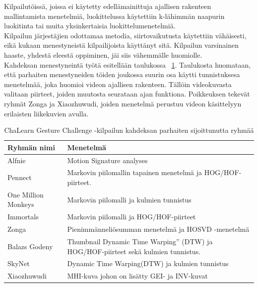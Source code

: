 Kilpailutöissä, joissa ei käytetty edellämainittuja ajallisen rakenteen mallintamista menetelmiä, 
luokittelussa käytettiin k-lähimmän naapurin luokitinta tai muita yksinkertaisia luokittelumenetelmiä. \\

Kilpailun järjestäjien odottamaa metodia, siirtovaikutusta käytettiin vähäisesti, eikä kukaan menestyneistä kilpailijoista käyttänyt sitä.
Kilpailun varsinainen haaste, yhdestä eleestä oppiminen, jäi siis vähemmälle huomiolle. \citep {6239178} \\

Kahdeksan menestyneintä työtä esitellään taulukossa ~\ref{table:dvbt_param}. Taulukosta huomataan, että parhaiten menestyneiden töiden
joukossa suurin osa käytti tunnistuksesa menetelmää, joka huomioi videon ajallisen rakenteen. Tällöin videokuvasta valitaan piirteet, joiden
muutosta seurataan ajan funktiona. Poikkeuksen tekevät ryhmät Zonga ja Xiaozhuwudi, joiden menetelmä perustuu videon käsittelyyn erilaisten liikekuvien avulla. 
\citep {6239178}\\

\begin{table}[th]
\caption{ChaLearn Gesture Challenge -kilpailun kahdeksan parhaiten sijoittunutta ryhmää}
\label{table:dvbt_param}
\begin{center}
\begin{tabular}{|p{}|p{}|} 
    \hline
Ryhmän nimi & Menetelmä \\
    \hline
    \hline
Alfnie & Motion Signature analyses\\ 
    \hline
Pennect & Markovin piilomallin tapainen menetelmä ja HOG/HOF-piirteet.\\
    \hline
One Million Monkeys & Markovin piilomalli ja kulmien tunnistus\\
    \hline
Immortals & Markovin piilomalli ja HOG/HOF-piirteet\\
    \hline
Zonga & Pienimmänneliösumman menetelmä ja HOSVD -menetelmä\\
    \hline
Balazs Godeny & Thumbnail Dynamic Time Warping” (DTW) ja HOG/HOF-piirteet sekä kulmien tunnistus.\\
    \hline
SkyNet & Dynamic Time Warping(DTW) ja kulmien tunnistus\\
    \hline
Xiaozhuwudi & MHI-kuva johon on lisätty GEI- ja INV-kuvat\\
    \hline	
\end{tabular}
\end{center}
\end{table}


